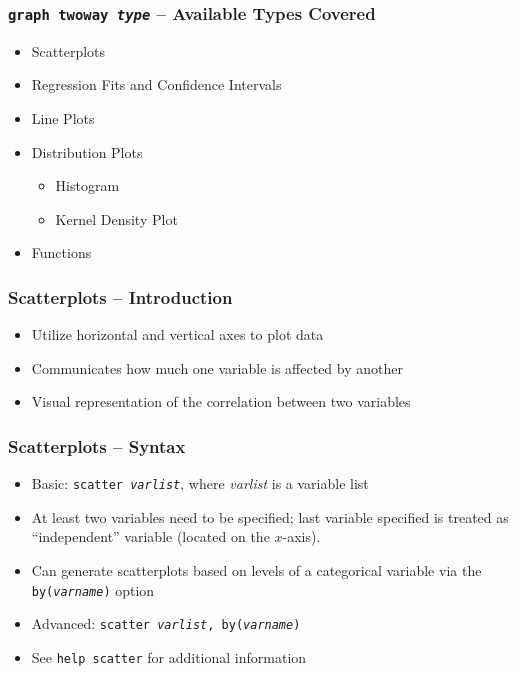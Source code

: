 \documentclass{beamer}
\begin{document}
\begin{frame}
	\frametitle{\texttt{graph twoway \textit{type}} -- Available Types Covered}
	
	\begin{itemize}
		\item Scatterplots
		\item Regression Fits and Confidence Intervals
		\item Line Plots
		\item Distribution Plots
		\begin{itemize}
			\item Histogram
			\item Kernel Density Plot
		\end{itemize}
		\item Functions
	\end{itemize}	
\end{frame}

\begin{frame}
	\frametitle{Scatterplots -- Introduction}
	
	\begin{itemize}
		\item Utilize horizontal and vertical axes to plot data
		\item Communicates how much one variable is affected by another
		\item Visual representation of the correlation between two variables
	\end{itemize}
\end{frame}

\begin{frame}
	\frametitle{Scatterplots -- Syntax}
	
	\begin{itemize}
		\item Basic: \texttt{scatter \textit{varlist}}, where \textit{varlist} is a variable list
		\item At least two variables need to be specified; last variable specified is treated as ``independent'' variable (located on the $x$-axis).
		\item Can generate scatterplots based on levels of a categorical variable via the \texttt{by(\textit{varname})} option
		\item Advanced: \texttt{scatter \textit{varlist}, by(\textit{varname})}
		\item See \texttt{help scatter} for additional information
	\end{itemize}
\end{frame}
\end{document}
